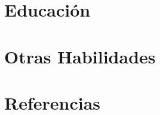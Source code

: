 \documentclass{res}
\begin{document}
\address{Sauces 8 Mz 454 Villa 2\\
\ \ \ \ Guayaquil-Ecuador\\
\ \ \ \ \ \ \ \ \ \ 084287897}
\begin{resume}
\vspace{0.4in}
\section{\large Educaci\'on}

\section{\large Otras Habilidades}

\section{\large Referencias}

\end{resume}
\end{document}

